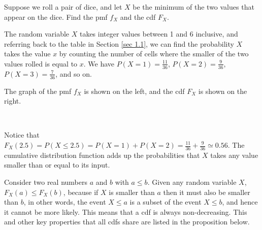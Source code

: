 \begin{examp} Suppose we roll a pair of dice, and let $X$ be the minimum of the two values that appear on the dice. Find the pmf $f_X$ and the cdf $F_X$.
\par
\noindent The random variable $X$ takes integer values between 1 and 6 inclusive, and referring back to the table in Section \ref{sec 1.1}, we can find the probability $X$ takes the value $x$ by counting the number of cells where the smaller of the two values rolled is equal to $x$. We have $P(X = 1) = \frac{11}{36}$, $P(X = 2) = \frac{9}{36}$, $P(X = 3) = \frac{7}{36}$, and so on.
\par
\noindent The graph of the pmf $f_X$ is shown on the left, and the cdf $F_X$ is shown on the right.

\begin{center}
\ \ \ \ \ \  
\end{center}
\par
\noindent Notice that $F_X(2.5) = P(X \leq 2.5) = P(X = 1) + P(X = 2) = \frac{11}{36} + \frac{9}{36} \simeq 0.56$. The cumulative distribution function adds up the probabilities that $X$ takes any value smaller than or equal to its input. 
\end{examp}
\par
Consider two real numbers $a$ and $b$ with $a \leq b$. Given any random variable $X$,  $F_X(a) \leq F_X(b)$, because if $X$ is smaller than $a$ then it must also be smaller than $b$, in other words, the event $X \leq a$ is a subset of the event $X \leq b$, and hence it cannot be more likely. This means that a cdf is always non-decreasing. This and other key properties that all cdfs share are listed in the proposition below.

